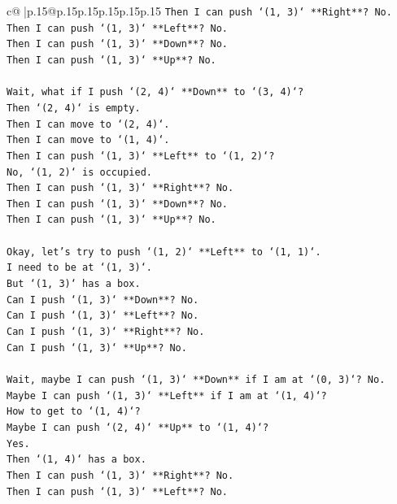 \documentclass{article}
\begin{document}
{\begin{supertabular}{c@{$\;$}|p{.15\linewidth}@{}p{.15\linewidth}p{.15\linewidth}p{.15\linewidth}p{.15\linewidth}p{.15\linewidth}}
{{{\texttt{Then I can push `(1, 3)` **Right**? No.} \\
\texttt{Then I can push `(1, 3)` **Left**? No.} \\
\texttt{Then I can push `(1, 3)` **Down**? No.} \\
\texttt{Then I can push `(1, 3)` **Up**? No.} \\
\\ 
\texttt{Wait, what if I push `(2, 4)` **Down** to `(3, 4)`?} \\
\texttt{Then `(2, 4)` is empty.} \\
\texttt{Then I can move to `(2, 4)`.} \\
\texttt{Then I can move to `(1, 4)`.} \\
\texttt{Then I can push `(1, 3)` **Left** to `(1, 2)`?} \\
\texttt{No, `(1, 2)` is occupied.} \\
\texttt{Then I can push `(1, 3)` **Right**? No.} \\
\texttt{Then I can push `(1, 3)` **Down**? No.} \\
\texttt{Then I can push `(1, 3)` **Up**? No.} \\
\\ 
\texttt{Okay, let's try to push `(1, 2)` **Left** to `(1, 1)`.} \\
\texttt{I need to be at `(1, 3)`.} \\
\texttt{But `(1, 3)` has a box.} \\
\texttt{Can I push `(1, 3)` **Down**? No.} \\
\texttt{Can I push `(1, 3)` **Left**? No.} \\
\texttt{Can I push `(1, 3)` **Right**? No.} \\
\texttt{Can I push `(1, 3)` **Up**? No.} \\
\\ 
\texttt{Wait, maybe I can push `(1, 3)` **Down** if I am at `(0, 3)`? No.} \\
\texttt{Maybe I can push `(1, 3)` **Left** if I am at `(1, 4)`?} \\
\texttt{How to get to `(1, 4)`?} \\
\texttt{Maybe I can push `(2, 4)` **Up** to `(1, 4)`?} \\
\texttt{Yes.} \\
\texttt{Then `(1, 4)` has a box.} \\
\texttt{Then I can push `(1, 3)` **Right**? No.} \\
\texttt{Then I can push `(1, 3)` **Left**? No.} \\
}}}
\end{supertabular}}
\end{document}

